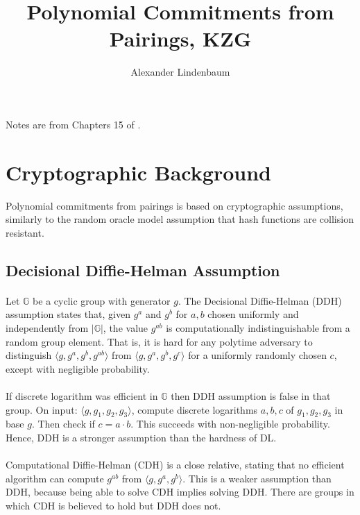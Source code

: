 \documentclass[11pt]{article}
\title{Polynomial Commitments from Pairings, KZG}
\author{Alexander Lindenbaum}
\date{}
\begin{document}
\maketitle

Notes are from Chapters 15 of \cite{tha22}.

\section{Cryptographic Background}
Polynomial commitments from pairings is based on cryptographic assumptions, similarly to the random oracle model assumption that hash functions are collision resistant.

\subsection{Decisional Diffie-Helman Assumption}
\paragraph{} Let $\mathbb{G}$ be a cyclic group with generator $g$. The Decisional Diffie-Helman (DDH) assumption states that, given $g^a$ and $g^b$ for $a, b$ chosen uniformly and independently from $|\mathbb{G}|$, the value $g^{ab}$ is computationally indistinguishable from a random group element. That is, it is hard for any polytime adversary to distinguish $\langle g, g^a, g^b, g^{ab}\rangle$ from $\langle g, g^a, g^b, g^c \rangle$ for a uniformly randomly chosen $c$, except with negligible probability.

\paragraph{} If discrete logarithm was efficient in $\mathbb{G}$ then DDH assumption is false in that group. On input: $\langle g, g_1, g_2, g_3 \rangle$, compute discrete logarithms $a, b, c$ of $g_1, g_2, g_3$ in base $g$. Then check if $c = a \cdot b$. This succeeds with non-negligible probability. Hence, DDH is a stronger assumption than the hardness of DL.

\paragraph{} Computational Diffie-Helman (CDH) is a close relative, stating that no efficient algorithm can compute $g^{ab}$ from $\langle g, g^a, g^b\rangle$. This is a weaker assumption than DDH, because being able to solve CDH implies solving DDH. There are groups in which CDH is believed to hold but DDH does not.
\end{document}
